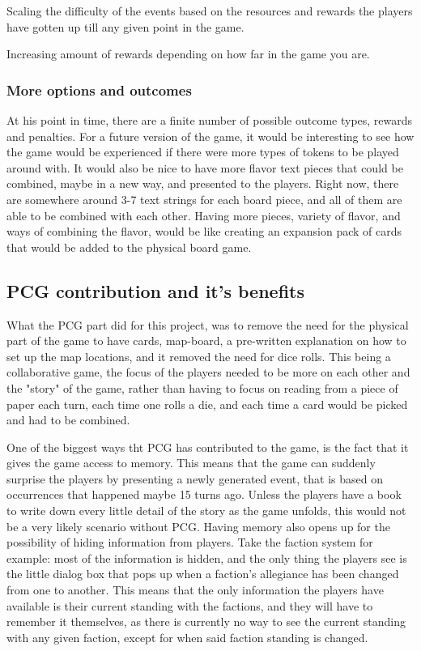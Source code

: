 Scaling the difficulty of the events based on the resources and rewards the players have gotten up till any given point in the game.

Increasing amount of rewards depending on how far in the game you are.

\subsubsection{More options and outcomes}
At his point in time, there are a finite number of possible outcome types, rewards and penalties. For a future version of the game, it would be interesting to see how the game would be experienced if there were more types of tokens to be played around with. It would also be nice to have more flavor text pieces that could be combined, maybe in a new way, and presented to the players. Right now, there are somewhere around 3-7 text strings for each board piece, and all of them are able to be combined with each other. Having more pieces, variety of flavor, and ways of combining the flavor, would be like creating an expansion pack of cards that would be added to the physical board game. 

\subsection{PCG contribution and it's benefits}
What the PCG part did for this project, was to remove the need for the physical part of the game to have cards, map-board, a pre-written explanation on how to set up the map locations, and it removed the need for dice rolls. This being a collaborative game, the focus of the players needed to be more on each other and the "story" of the game, rather than having to focus on reading from a piece of paper each turn, each time one rolls a die, and each time a card would be picked and had to be combined.

One of the biggest ways tht PCG has contributed to the game, is the fact that it gives the game access to memory. This means that the game can suddenly surprise the players by presenting a newly generated event, that is based on occurrences that happened maybe 15 turns ago. Unless the players have a book to write down every little detail of the story as the game unfolds, this would not be a very likely scenario without PCG. 
Having memory also opens up for the possibility of hiding information from players. Take the faction system for example: most of the information is hidden, and the only thing the players see is the little dialog box that pops up when a faction's allegiance has been changed from one to another. This means that the only information the players have available is their current standing with the factions, and they will have to remember it themselves, as there is currently no way to see the current standing with any given faction, except for when said faction standing is changed. 


